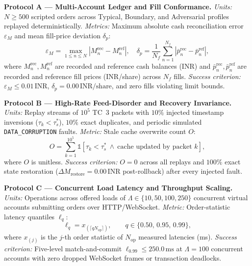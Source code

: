 \documentclass[journal,onecolumn,10pt]{IEEEtran}
\newcommand{\thinunit}[2]{#1\,\text{#2}}
\begin{document}
\textbf{Protocol A --- Multi-Account Ledger and Fill Conformance.} \emph{Units:} $N \ge 500$ scripted orders across Typical, Boundary, and Adversarial profiles replayed deterministically. \emph{Metrics:} Maximum absolute cash reconciliation error $\varepsilon_M$ and mean fill-price deviation $\delta_p$:
\begin{equation}
\varepsilon_M=\max_{1\le n\le N}\left|M^{\mathrm{rec}}_n-M^{\mathrm{ref}}_n\right|,\quad
\delta_p=\frac{1}{N_f}\sum_{n=1}^{N_f}\left|\bar{p}^{\mathrm{rec}}_n-\bar{p}^{\mathrm{ref}}_n\right|,
\label{eq:metricA}
\end{equation}
where $M^{\mathrm{rec}}_n, M^{\mathrm{ref}}_n$ are recorded and reference cash balances (INR) and $\bar{p}^{\mathrm{rec}}_n, \bar{p}^{\mathrm{ref}}_n$ are recorded and reference fill prices (INR/share) across $N_f$ fills. \emph{Success criterion:} $\varepsilon_M \le \thinunit{0.01}{INR}$, $\delta_p = \thinunit{0.00}{INR/share}$, and zero fills violating limit bounds.

\textbf{Protocol B --- High-Rate Feed-Disorder and Recovery Invariance.} \emph{Units:} Replay streams of $10^5$ TC~3 packets with $10\%$ injected timestamp inversions ($\tau_k < \tau^{*}_s$), $10\%$ exact duplicates, and periodic simulated \texttt{DATA\_CORRUPTION} faults. \emph{Metric:} Stale cache overwrite count $O$:
\begin{equation}
O=\sum_{k=1}^{10^5}\mathbb{1}\!\left[\tau_k<\tau^{*}_{s}\ \wedge\ \text{cache updated by packet }k\right],
\label{eq:metricB}
\end{equation}
where $O$ is unitless. \emph{Success criterion:} $O=0$ across all replays and $100\%$ exact state restoration ($\Delta M_{\mathrm{restore}}=\thinunit{0.00}{INR}$ post-rollback) after every injected fault.

\textbf{Protocol C --- Concurrent Load Latency and Throughput Scaling.} \emph{Units:} Operations across offered loads of $\Lambda \in \{10, 50, 100, 250\}$ concurrent virtual accounts submitting orders over HTTP/WebSocket. \emph{Metric:} Order-statistic latency quantiles $\ell_q$:
\begin{equation}
\ell_q = x_{(\lceil qN_{\mathrm{op}}\rceil)},\qquad q\in\{0.50,\,0.95,\,0.99\},
\label{eq:metricC}
\end{equation}
where $x_{(j)}$ is the $j$-th order statistic of $N_{\mathrm{op}}$ measured latencies (ms). \emph{Success criterion:} Five-level match-and-commit $\ell_{0.99} \le \thinunit{250.0}{ms}$ at $\Lambda=100$ concurrent accounts with zero dropped WebSocket frames or transaction deadlocks.
\end{document}
